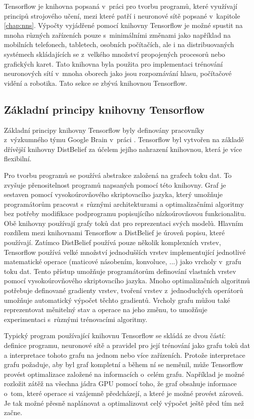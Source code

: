 Tensorflow je knihovna popsaná v~práci \cite{Abadi2015} pro tvorbu programů, které využívají principů strojového učení, mezi které patří i neuronové sítě popsané v~kapitole \ref{chap:nns}.
Výpočty vyjádřené pomocí knihovny Tensorflow je možné spustit na mnoha různých zařízeních pouze s~minimálními změnami jako například na mobilních telefonech, tabletech, osobních počítačích, ale i na distribuovaných systémech skládajících se z~velkého množství propojených procesorů nebo grafických karet.
Tato knihovna byla použita pro implementaci trénování neuronových sítí v~mnoha oborech jako jsou rozpoznávání hlasu, počítačové vidění a robotika.
Tato sekce se zbývá knihovnou Tensorflow.

\subsection{Základní principy knihovny Tensorflow}
\label{sub:tf_basics}

Základní principy knihovny Tensorflow byly definovány pracovníky z~výzkumného týmu Google Brain v~práci \cite{Abadi2016}.
Tensorflow byl vytvořen na základě dřívější knihovny DistBelief za účelem jejího nahrazení knihovnou, která je více flexibilní.

Pro tvorbu programů se používá abstrakce založená na grafech toku dat.
To zvyšuje přenositelnost programů napsaných pomocí této knihovny.
Graf je sestaven pomocí vysokoúrovňového skriptovacího jazyka, který umožňuje programátorům pracovat s~různými architekturami a optimalizačními algoritmy bez potřeby modifikace podprogramu popisujícího nízkoúrovňovou funkcionalitu.
Obě knihovny používají grafy toků dat pro reprezentaci svých modelů. 
Hlavním rozdílem mezi knihovnami Tensorflow a DistBelief je úroveň popisu, které používají.
Zatímco DistBelief používá pouze několik komplexních vrstev, Tensorflow používá velké množství jednodušších vrstev implementující jednotlivé matematické operace (maticové násobením, konvoluce, ...) jako vrcholy v~grafu toku dat.
Tento přístup umožňuje programátorům definování vlastních vrstev pomocí vysokoúrovňového skriptovacího jazyka.
Mnoho optimalizačních algoritmů potřebuje definované gradienty vrstev, tvoření vrstev z~jednoduchých operátorů umožňuje automatický výpočet těchto gradientů.
Vrcholy grafu můžou také reprezentovat měnitelný stav a operace na jeho změnu, to umožňuje experimentaci s~různými trénovacími algoritmy.

Typický program používající knihovnu Tensorflow se skládá ze dvou částí: definice programu, neuronové sítě a pravidel pro její trénování jako grafu toků dat a interpretace tohoto grafu na jednom nebo více zařízeních.
Protože interpretace grafu požaduje, aby byl graf kompletní a během ní se neměnil, může Tensorflow provést optimalizace založené na informacích o~celém grafu.
Například je možné rozložit zátěž na všechna jádra GPU pomocí toho, že graf obsahuje informace o~tom, které operace si vzájemně předcházejí, a které je možné provést zároveň.
Je tak možné přesně naplánovat a optimalizovat celý výpočet ještě před tím než začne.


